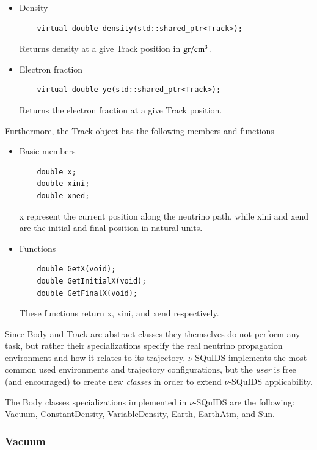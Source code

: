 \documentclass[3p,12pt,authoryear]{elsarticle}
\newcommand{\ttf}{\ttfamily}
\begin{document}
\begin{itemize}
\item Density 
  \begin{lstlisting}
    virtual double density(std::shared_ptr<Track>);
  \end{lstlisting}
Returns density at a give {\ttf Track} position in ${\rm gr}/{\rm cm}^3$.
\item Electron fraction
  \begin{lstlisting}
    virtual double ye(std::shared_ptr<Track>);
  \end{lstlisting}
Returns the electron fraction at a give {\ttf Track} position.
\end{itemize}

Furthermore, the {\ttf Track} object has the following members and functions

\begin{itemize}
\item Basic members 
  \begin{lstlisting}
    double x;
    double xini;
    double xned;
  \end{lstlisting}
{\ttf x} represent the current position along the neutrino path, while {\ttf xini} and {\ttf xend} are the
initial and final position in natural units.
\item Functions
  \begin{lstlisting}
    double GetX(void);
    double GetInitialX(void);
    double GetFinalX(void);
  \end{lstlisting}
These functions return {\ttf x}, {\ttf xini}, and {\ttf xend} respectively.
\end{itemize}

Since {\ttf Body} and {\ttf Track} are abstract classes they themselves do not perform any task, but rather their specializations specify the real neutrino propagation environment and how it relates to its trajectory. $\nu$-SQuIDS implements the most common used environments and trajectory configurations, but the {\it user} is free (and encouraged) to create new {\it classes} in order to extend $\nu$-SQuIDS applicability.

The {\ttf Body} classes specializations implemented in $\nu$-SQuIDS are the following: {\ttf Vacuum}, {\ttf ConstantDensity}, {\ttf VariableDensity}, {\ttf Earth}, {\ttf EarthAtm}, and {\ttf Sun}.

\subsubsection{{\ttf Vacuum}}
\end{document}
